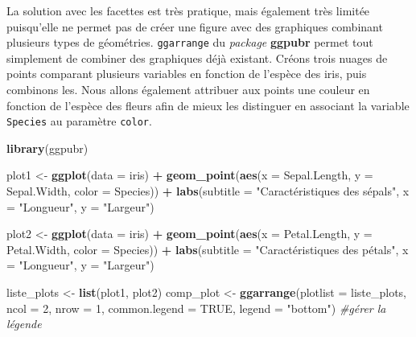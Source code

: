 \documentclass[
  11pt,
  french,
]{book}
\makeatletter
\newenvironment{Shaded}{\begin{snugshade}}{\end{snugshade}}
\newcommand{\CommentTok}[1]{\textcolor[rgb]{0.56,0.35,0.01}{\textit{#1}}}
\newcommand{\DataTypeTok}[1]{\textcolor[rgb]{0.13,0.29,0.53}{#1}}
\newcommand{\DecValTok}[1]{\textcolor[rgb]{0.00,0.00,0.81}{#1}}
\newcommand{\KeywordTok}[1]{\textcolor[rgb]{0.13,0.29,0.53}{\textbf{#1}}}
\newcommand{\NormalTok}[1]{#1}
\newcommand{\OperatorTok}[1]{\textcolor[rgb]{0.81,0.36,0.00}{\textbf{#1}}}
\newcommand{\OtherTok}[1]{\textcolor[rgb]{0.56,0.35,0.01}{#1}}
\newcommand{\StringTok}[1]{\textcolor[rgb]{0.31,0.60,0.02}{#1}}
\newenvironment{kframe}{%
\medskip{}
\setlength{\fboxsep}{.8em}
 \def\at@end@of@kframe{}%
 \ifinner\ifhmode%
  \def\at@end@of@kframe{\end{minipage}}%
  \begin{minipage}{\columnwidth}%
 \fi\fi%
 \def\FrameCommand##1{\hskip\@totalleftmargin \hskip-\fboxsep
 \colorbox{shadecolor}{##1}\hskip-\fboxsep
     \hskip-\linewidth \hskip-\@totalleftmargin \hskip\columnwidth}%
 \MakeFramed {\advance\hsize-\width
   \@totalleftmargin\z@ \linewidth\hsize
   \@setminipage}}%
 {\par\unskip\endMakeFramed%
 \at@end@of@kframe}
\renewenvironment{Shaded}{\begin{kframe}}{\end{kframe}}
\makeatother
\begin{document}
La solution avec les facettes est très pratique, mais également très limitée puisqu'elle ne permet pas de créer une figure avec des graphiques combinant plusieurs types de géométries. \texttt{ggarrange} du \emph{package} \textbf{ggpubr} permet tout simplement de combiner des graphiques déjà existant. Créons trois nuages de points comparant plusieurs variables en fonction de l'espèce des iris, puis combinons les. Nous allons également attribuer aux points une couleur en fonction de l'espèce des fleurs afin de mieux les distinguer en associant la variable \texttt{Species} au paramètre \texttt{color}.

\begin{Shaded}
\begin{Highlighting}[]
\KeywordTok{library}\NormalTok{(ggpubr)}

\NormalTok{plot1 <-}\StringTok{ }\KeywordTok{ggplot}\NormalTok{(}\DataTypeTok{data =}\NormalTok{ iris) }\OperatorTok{+}
\StringTok{  }\KeywordTok{geom_point}\NormalTok{(}\KeywordTok{aes}\NormalTok{(}\DataTypeTok{x =}\NormalTok{ Sepal.Length, }\DataTypeTok{y =}\NormalTok{ Sepal.Width, }\DataTypeTok{color =}\NormalTok{ Species)) }\OperatorTok{+}
\StringTok{  }\KeywordTok{labs}\NormalTok{(}\DataTypeTok{subtitle =} \StringTok{"Caractéristiques des sépals"}\NormalTok{,}
       \DataTypeTok{x =} \StringTok{"Longueur"}\NormalTok{, }
       \DataTypeTok{y =} \StringTok{"Largeur"}\NormalTok{)}

\NormalTok{plot2 <-}\StringTok{ }\KeywordTok{ggplot}\NormalTok{(}\DataTypeTok{data =}\NormalTok{ iris) }\OperatorTok{+}
\StringTok{  }\KeywordTok{geom_point}\NormalTok{(}\KeywordTok{aes}\NormalTok{(}\DataTypeTok{x =}\NormalTok{ Petal.Length, }\DataTypeTok{y =}\NormalTok{ Petal.Width, }\DataTypeTok{color =}\NormalTok{ Species)) }\OperatorTok{+}
\StringTok{  }\KeywordTok{labs}\NormalTok{(}\DataTypeTok{subtitle =} \StringTok{"Caractéristiques des pétals"}\NormalTok{,}
       \DataTypeTok{x =} \StringTok{"Longueur"}\NormalTok{, }
       \DataTypeTok{y =} \StringTok{"Largeur"}\NormalTok{)}

\NormalTok{liste_plots <-}\StringTok{ }\KeywordTok{list}\NormalTok{(plot1, plot2)}
\NormalTok{comp_plot <-}\StringTok{ }\KeywordTok{ggarrange}\NormalTok{(}\DataTypeTok{plotlist =}\NormalTok{ liste_plots, }\DataTypeTok{ncol =} \DecValTok{2}\NormalTok{, }\DataTypeTok{nrow =} \DecValTok{1}\NormalTok{,}
          \DataTypeTok{common.legend =} \OtherTok{TRUE}\NormalTok{, }\DataTypeTok{legend =} \StringTok{"bottom"}\NormalTok{) }\CommentTok{#gérer la légende}


\end{Highlighting}
\end{Shaded}
\end{document}
